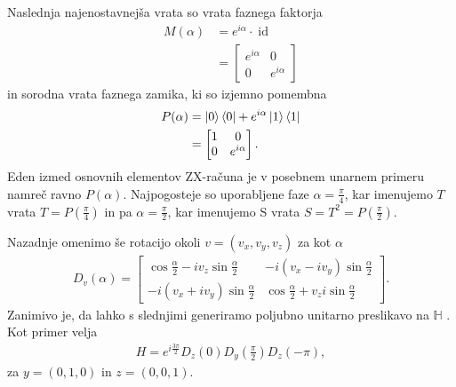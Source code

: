 \documentclass[mat1]{fmfdelo}
\newcommand{\Hb}{\mathbb H}
\DeclareMathOperator*{\id}{id}
\begin{document}
Naslednja najenostavnejša vrata so vrata faznega faktorja
\begin{align*}
    M(\alpha) &= e^{i\alpha}\cdot \id\\
              &= \begin{bmatrix}
                  e^{i\alpha}&0\\
                  0&e^{i\alpha}
              \end{bmatrix}
\end{align*}
in sorodna vrata faznega zamika, ki so izjemno pomembna
\begin{align*}
    P(\alpha) &= \ket0\bra0 + e^{i\alpha}\ket1\bra1\\
              &= \begin{bmatrix}
                  1&0\\
                  0&e^{i\alpha}
              \end{bmatrix}.
\end{align*}
Eden izmed osnovnih elementov ZX-računa je v posebnem unarnem primeru namreč ravno \(P(\alpha)\). Najpogosteje so uporabljene faze \(\alpha=\frac\pi4\), kar imenujemo \(T\) vrata \(T=P(\frac\pi4)\) in pa \(\alpha=\frac\pi2\), kar imenujemo S vrata \(S = T^2=P(\frac\pi2)\).

Nazadnje omenimo še rotacijo okoli \(v=(v_x,v_y,v_z)\) za kot \(\alpha\)
\begin{align*}
    D_v(\alpha) = \begin{bmatrix}
        \cos\frac\alpha2 - iv_z\sin\frac\alpha2 & -i(v_x-iv_y)\sin\frac\alpha2\\
        -i(v_x+iv_y)\sin\frac\alpha2 & \cos\frac\alpha2 + v_zi\sin\frac\alpha2
    \end{bmatrix}.
\end{align*}
Zanimivo je, da lahko s slednjimi generiramo poljubno unitarno preslikavo na \(\Hb\) \cite[Lema 2.35]{mathforqm}. Kot primer velja 
\begin{align*}
    H = e^{i\frac{3\pi}{2}}D_z(0)D_y\left(\frac\pi2\right)D_z(-\pi),
\end{align*}
za \(y=(0,1,0)\) in \(z=(0,0,1)\).
\end{document}
